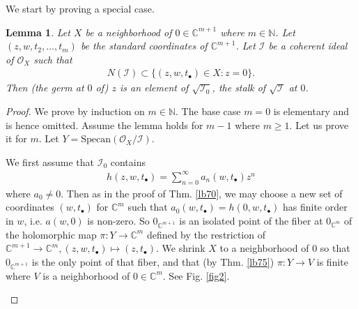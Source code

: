 \documentclass[12pt,b5paper,notitlepage]{report}
\theoremstyle{definition}
\theoremstyle{plain}
\newtheorem{lm}[df]{Lemma}
\newcommand{\mc}{\mathcal}
\newcommand{\scr}{\mathscr}
\newcommand{\blt}{\bullet}
\newcommand{\Cbb}{\mathbb C}
\newcommand{\Nbb}{\mathbb N}
\newcommand{\Specan}{\mathrm{Specan}}
\numberwithin{equation}{section}
\begin{document}
We start by proving a special case.

\begin{lm}\label{lb100}
Let $X$ be a neighborhood of $0\in\Cbb^{m+1}$ where $m\in\Nbb$. Let $(z,w,t_2,\dots,t_m)$ be the standard coordinates of $\Cbb^{m+1}$. Let $\mc I$ be a coherent ideal of $\scr O_X$ such that
\begin{align*}
N(\mc I)\subset\{(z,w,t_\blt)\in X:z=0\}.
\end{align*}
Then (the germ at $0$ of) $z$ is an element of $\sqrt{\mc I_0}$, the stalk of $\sqrt{\mc I}$ at $0$.
\end{lm}


\begin{proof}
We prove by induction on $m\in\Nbb$. The base case $m=0$ is elementary and is hence omitted. Assume the lemma holds for $m-1$ where $m\geq 1$. Let us prove it for $m$. Let $Y=\Specan(\scr O_X/\mc I)$.

We first assume that $\mc I_0$ contains
\begin{align}
h(z,w,t_\blt)=\sum_{n=0}^\infty a_n(w,t_\blt)z^n\label{eq52}
\end{align}
where $a_0\neq 0$. Then as in the proof of Thm. \ref{lb70}, we may choose a new set of coordinates $(w,t_\blt)$ for $\Cbb^m$ such that $a_0(w,t_\blt)=h(0,w,t_\blt)$ has finite order in $w$, i.e. $a(w,0)$ is non-zero. So $0_{\Cbb^{m+1}}$ is an isolated point of the fiber at $0_{\Cbb^m}$ of the holomorphic map $\pi:Y\rightarrow \Cbb^m$ defined by the restriction of $\Cbb^{m+1}\rightarrow\Cbb^m,(z,w,t_\blt)\mapsto (z,t_\blt)$. We shrink $X$ to a neighborhood of $0$ so that $0_{\Cbb^{m+1}}$ is the only point of that fiber, and that (by Thm. \ref{lb75}) $\pi:Y\rightarrow V$ is finite where  $V$ is a neighborhood of $0\in\Cbb^m$. See Fig. \ref{fig2}.
\begin{figure}[h]
	\centering




\begin{tikzpicture}[x=0.75pt,y=0.75pt,yscale=-1,xscale=1]


\end{tikzpicture}
\end{figure}
\end{proof}
\end{document}
